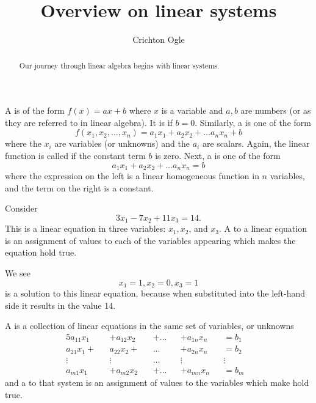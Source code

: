 \documentclass{ximera}
\title{Overview on linear systems}
\author{Crichton Ogle}
\begin{document}
\begin{abstract}
  Our journey through linear algebra begins with linear systems.
\end{abstract}

\maketitle


\begin{definition}
  A  is of the form $f(x) = ax+b$ where $x$ is a variable and $a,b$ are numbers (or  as they are referred to in linear algebra). It is  if $b=0$. Similarly, a  is one of the form
  \[
    f(x_1,x_2,\dots,x_n) = a_1x_1 + a_2x_2 + \dots a_nx_n + b
  \]
  where the $x_i$ are variables (or unknowns) and the $a_i$ are scalars. Again, the linear function is called  if the constant term $b$ is zero. Next, a  is one of the form
  \[
    a_1x_1 + a_2x_2 + \dots a_nx_n =  b
  \]
  where the expression on the left is a linear homogeneous function in $n$ variables, and the term on the right is a constant.
\end{definition}

\begin{example}
  Consider
  \begin{equation}
    3x_1 - 7x_2 + 11x_3 = 14.
  \end{equation}
  This is a linear equation in three variables: $x_1, x_2$, and
  $x_3$. A  to a linear equation is an assignment of
  values to each of the variables appearing which makes the equation
  hold true.

  We see
  \[
    x_1 = 1, x_2 = 0, x_3 = 1
  \]
  is a solution to this linear equation, because when substituted into the left-hand side it results in the value 14.
\end{example}

\begin{definition}
  A  is a collection of linear equations in the same set of variables, or unknowns
  \begin{alignat*}{5}\tag{2.2}\label{eqn:sys}
    a_{11}x_1 &&+ a_{12}x_2 && + {}\ldots{} && + a_{1n}x_n && =  b_1 &\\
    a_{21}x_1 + && a_{22}x_2 + &&  {}\ldots{} && + a_{2n}x_n &&  = b_2 &\\
    \vdots &&  \vdots &&  {}\ldots{} &&  \vdots &&   \vdots &\\
    a_{m1}x_1 &&+ a_{m2}x_2 && + {}\ldots{} && + a_{mn}x_n && =  b_m &
  \end{alignat*}
  and a  to that system is an assignment of values to the variables which make  hold true.
\end{definition}
\end{document}
